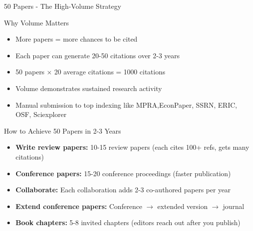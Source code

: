 \documentclass[11pt]{beamer}
\begin{document}
	\begin{frame}{50 Papers - The High-Volume Strategy}
		\scriptsize
		\begin{block}{Why Volume Matters}
			\begin{itemize}
				\item More papers = more chances to be cited
				\item Each paper can generate 20-50 citations over 2-3 years
				\item 50 papers × 20 average citations = 1000 citations
				\item Volume demonstrates sustained research activity
				\item Manual submission to top indexing like MPRA,EconPaper, SSRN, ERIC, OSF, Sciexplorer
			\end{itemize}
		\end{block}
		\begin{block}{How to Achieve 50 Papers in 2-3 Years}
			\begin{itemize}
				\item \textbf{Write review papers:} 10-15 review papers (each cites 100+ refs, gets many citations)
				\item \textbf{Conference papers:} 15-20 conference proceedings (faster publication)
				\item \textbf{Collaborate:} Each collaboration adds 2-3 co-authored papers per year
				\item \textbf{Extend conference papers:} Conference $\rightarrow$ extended version $\rightarrow$ journal
				\item \textbf{Book chapters:} 5-8 invited chapters (editors reach out after you publish)
			\end{itemize}
		\end{block}
	\end{frame}
	
\end{document}
